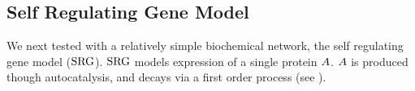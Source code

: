 \subsection{Self Regulating Gene Model}
\label{sec:srg}

We next tested  with a relatively simple biochemical network, the self regulating gene model ($\text{SRG}$)\supercite{Roberts:2015iu}. $\text{SRG}$ models expression of a single protein $A$. $A$ is produced though autocatalysis, and decays via a first order process (see ).

